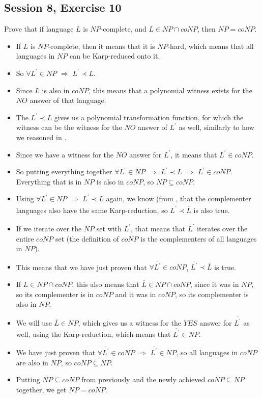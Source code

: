 \subsection {Session 8, Exercise 10}
\label{8f10}


Prove that if language $L$ is $NP$-complete, and $L\in{}NP\cap{}coNP$, then $NP=coNP$.



\begin{itemize}
    \item If $L$ is $NP$-complete, then it means that it is $NP$-hard, which means that all languages in $NP$ can be Karp-reduced onto it.
    \item So $\forall{}L^{'}\in{}NP$ $\Rightarrow$ $L^{'}\prec{}L$.
    \item Since $L$ is also in $coNP$, this means that a polynomial witness exists for the $NO$ answer of that language.
    \item The $L^{'}\prec{}L$ gives us a polynomial transformation function, for which the witness can be the witness for the $NO$ answer of $L^{'}$ as well, similarly to how we reasoned in .
    \item Since we have a witness for the $NO$ answer for $L^{'}$, it means that $L^{'}\in{}coNP$.
    \item So putting everything together $\forall{}L^{'}\in{}NP$ $\Rightarrow$ $L^{'}\prec{}L$ $\Rightarrow$ $L^{'}\in{}coNP$. Everything that is in $NP$ is also in $coNP$, so $NP\subseteq{}coNP$.
    \item Using $\forall{}L^{'}\in{}NP$ $\Rightarrow$ $L^{'}\prec{}L$ again, we know (from , that the complementer languages also have the same Karp-reduction, so $\overline{L^{'}}\prec{}\overline{L}$ is also true.
    \item If we iterate over the $NP$ set with $L^{'}$, that means that $\overline{L^{'}}$ iterates over the entire $coNP$ set (the definition of $coNP$ is the complementers of all languages in $NP$).
    \item This means that we have just proven that $\forall{}\overline{L^{'}}\in{}coNP$, $\overline{L^{'}}\prec{}\overline{L}$ is true.
    \item If $L \in{} NP\cap{}coNP$, this also means that $\overline{L} \in{} NP\cap{}coNP$, since it was in $NP$, so its complementer is in $coNP$ and it was in $coNP$, so its complementer is also in $NP$.
    \item We will use $\overline{L} \in{} NP$, which gives us a witness for the $YES$ answer for $\overline{L^{'}}$ as well, using the Karp-reduction, which means that $\overline{L^{'}}\in{}NP$.
    \item We have just proven that $\forall{}\overline{L^{'}}\in{}coNP$ $\Rightarrow$ $\overline{L^{'}}\in{}NP$, so all languages in $coNP$ are also in $NP$, so $coNP \subseteq{} NP$.
    \item Putting $NP \subseteq{} coNP$ from previously and the newly achieved $coNP \subseteq{} NP$ together, we get $NP = coNP$.
\end{itemize}
